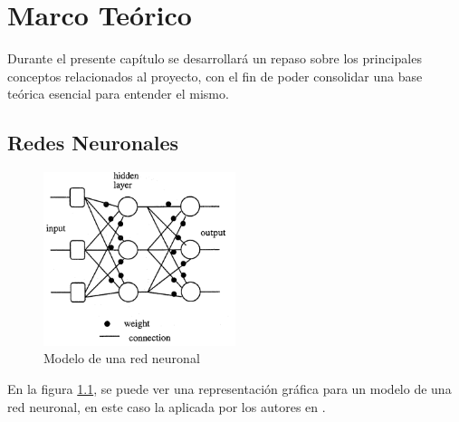   \chapter{Marco Teórico} 
\label{C:antecedentes}
Durante el presente capítulo se desarrollará un repaso sobre los principales conceptos relacionados al proyecto, con el fin de poder consolidar una base teórica esencial para entender el mismo.
\section{Redes Neuronales}
\begin{figure}[H]
    \centering
    \includegraphics[width=0.5\textwidth]{imagenes/marco teorico/modelo_red.png}
    \caption{Modelo de una red neuronal \cite{nallasamy}}
    \label{neural_model}
\end{figure}
\par
En la figura \ref{neural_model}, se puede ver una representación gráfica para un modelo de una red neuronal, en este caso la aplicada por los autores en \cite{nallasamy}.
